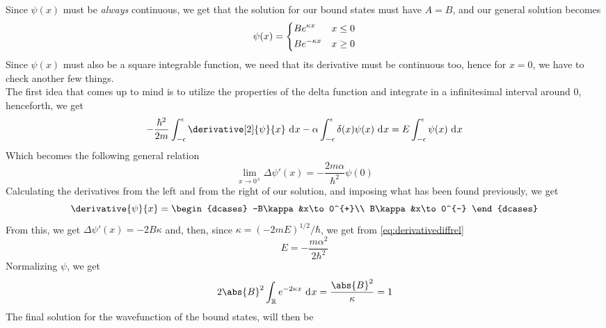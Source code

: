 \documentclass[a4paper, 11pt]{book}
\newcommand{\1}{\opr{\mathds{1}}}
\newcommand{\diff}[2][]{\ \mathrm{d}^{#1}#2}
\theoremstyle{plain}
\begin{document}
	Since $\psi(x)$ must be \emph{always} continuous, we get that the solution for our bound states must have $A=B$, and our general solution becomes
	\begin{equation}
		\psi(x)=\begin{dcases}
			Be^{\kappa x}&x\le0\\
			Be^{-\kappa x}&x\ge0
		\end{dcases}
		\label{eq:gensoldeltapotbound}
	\end{equation}
	Since $\psi(x)$ must also be a square integrable function, we need that its derivative must be continuous too, hence for $x=0$, we have to check another few things.\\
	The first idea that comes up to mind is to utilize the properties of the delta function and integrate in a infinitesimal interval around $0$, henceforth, we get
	\begin{equation}
			-\frac{\hbar^2}{2m}\int_{-\epsilon}^{\epsilon}\derivative[2]{\psi}{x}\diff{x}-\alpha\int_{-\epsilon}^{\epsilon}\delta(x)\psi(x)\diff{x}=E\int_{-\epsilon}^{\epsilon}\psi(x)\diff{x}\\
		\label{eq:continuityderdeltapot}
	\end{equation}
	Which becomes the following general relation
	\begin{equation}
		\lim_{x\to0^{\pm}}\Delta\psi'(x)=-\frac{2m\alpha}{\hbar^2}\psi(0)
		\label{eq:derivativediffrel}
	\end{equation}
	Calculating the derivatives from the left and from the right of our solution, and imposing what has been found previously, we get
	\begin{equation}
		\derivative{\psi}{x}=\begin{dcases}
			-B\kappa&x\to0^{+}\\
			B\kappa&x\to0^{-}
		\end{dcases}
		\label{eq:derpsideltapot}
	\end{equation}
	From this, we get $\Delta\psi'(x)=-2B\kappa$ and, then, since $\kappa=(-2mE)^{1/2}/\hbar$, we get from \eqref{eq:derivativediffrel}
	\begin{equation}
		E=-\frac{m\alpha^2}{2\hbar^2}
		\label{eq:boundstatedelta}
	\end{equation}
	Normalizing $\psi$, we get
	\begin{equation}
		2\abs{B}^2\int_{\mathbb{R}}e^{-2\kappa x}\diff{x}=\frac{\abs{B}^2}{\kappa}=1
		\label{eq:normdiracdelta}
	\end{equation}
	The final solution for the wavefunction of the bound states, will then be
\end{document}
